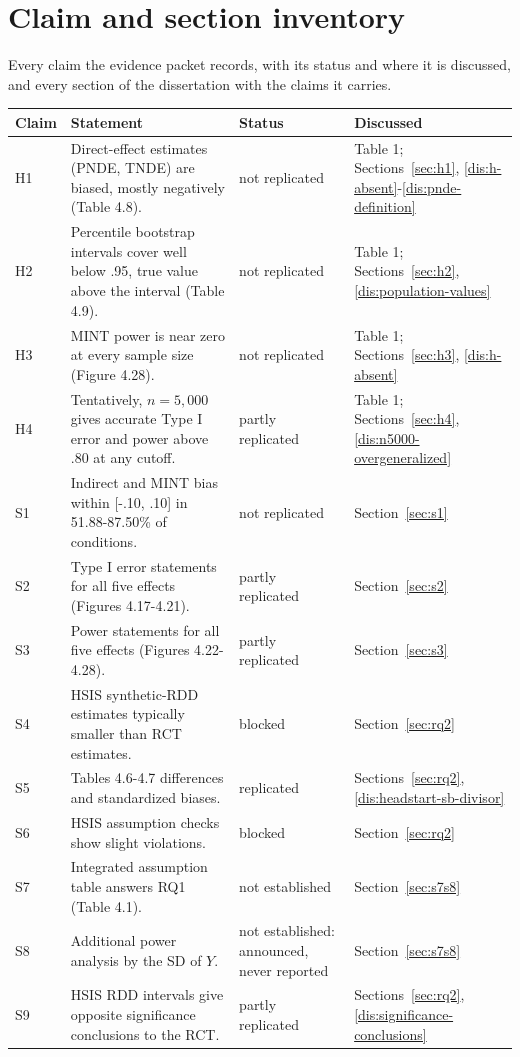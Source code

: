 \section{Claim and section inventory}\label{app:inventory}

Every claim the evidence packet records, with its status and where it is discussed, and every section of the dissertation with the claims it carries.

{\footnotesize
\begin{longtable}{@{}>{\raggedright\arraybackslash}p{}>{\raggedright\arraybackslash}p{}>{\raggedright\arraybackslash}p{}>{\raggedright\arraybackslash}p{}@{}}
\toprule
Claim & Statement \citep{chen2021} & Status & Discussed\\
\midrule\endhead
H1 & Direct-effect estimates (PNDE, TNDE) are biased, mostly negatively (Table 4.8). & not replicated & Table 1; Sections~\ref{sec:h1}, \ref{dis:h-absent}-\ref{dis:pnde-definition}\\
H2 & Percentile bootstrap intervals cover well below .95, true value above the interval (Table 4.9). & not replicated & Table 1; Sections~\ref{sec:h2}, \ref{dis:population-values}\\
H3 & MINT power is near zero at every sample size (Figure 4.28). & not replicated & Table 1; Sections~\ref{sec:h3}, \ref{dis:h-absent}\\
H4 & Tentatively, $n = 5{,}000$ gives accurate Type I error and power above .80 at any cutoff. & partly replicated & Table 1; Sections~\ref{sec:h4}, \ref{dis:n5000-overgeneralized}\\
S1 & Indirect and MINT bias within [-.10, .10] in 51.88-87.50\% of conditions. & not replicated & Section~\ref{sec:s1}\\
S2 & Type I error statements for all five effects (Figures 4.17-4.21). & partly replicated & Section~\ref{sec:s2}\\
S3 & Power statements for all five effects (Figures 4.22-4.28). & partly replicated & Section~\ref{sec:s3}\\
S4 & HSIS synthetic-RDD estimates typically smaller than RCT estimates. & blocked & Section~\ref{sec:rq2}\\
S5 & Tables 4.6-4.7 differences and standardized biases. & replicated & Sections~\ref{sec:rq2}, \ref{dis:headstart-sb-divisor}\\
S6 & HSIS assumption checks show slight violations. & blocked & Section~\ref{sec:rq2}\\
S7 & Integrated assumption table answers RQ1 (Table 4.1). & not established & Section~\ref{sec:s7s8}\\
S8 & Additional power analysis by the SD of $Y$. & not established: announced, never reported & Section~\ref{sec:s7s8}\\
S9 & HSIS RDD intervals give opposite significance conclusions to the RCT. & partly replicated & Sections~\ref{sec:rq2}, \ref{dis:significance-conclusions}\\
\bottomrule
\end{longtable}}


